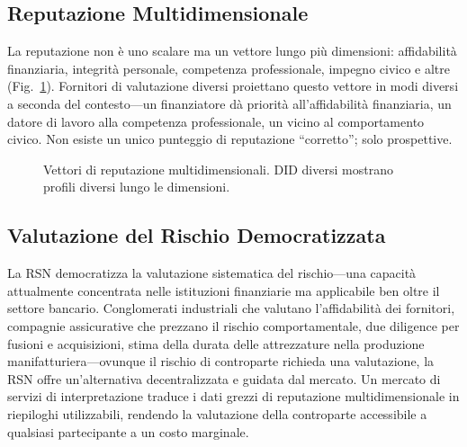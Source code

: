 \documentclass[11pt,a4paper,twocolumn]{article}
\begin{document}
\subsection{Reputazione Multidimensionale}

La reputazione non è uno scalare ma un vettore lungo più dimensioni: affidabilità finanziaria, integrità personale, competenza professionale, impegno civico e altre (Fig.~\ref{fig:reputation-radar}). Fornitori di valutazione diversi proiettano questo vettore in modi diversi a seconda del contesto---un finanziatore dà priorità all'affidabilità finanziaria, un datore di lavoro alla competenza professionale, un vicino al comportamento civico. Non esiste un unico punteggio di reputazione ``corretto''; solo prospettive.

\begin{figure}[ht]
\centering
{}
\caption{Vettori di reputazione multidimensionali. DID diversi mostrano profili diversi lungo le dimensioni.}
\label{fig:reputation-radar}
\end{figure}

\subsection{Valutazione del Rischio Democratizzata}

La RSN democratizza la valutazione sistematica del rischio---una capacità attualmente concentrata nelle istituzioni finanziarie ma applicabile ben oltre il settore bancario. Conglomerati industriali che valutano l'affidabilità dei fornitori, compagnie assicurative che prezzano il rischio comportamentale, due diligence per fusioni e acquisizioni, stima della durata delle attrezzature nella produzione manifatturiera---ovunque il rischio di controparte richieda una valutazione, la RSN offre un'alternativa decentralizzata e guidata dal mercato. Un mercato di servizi di interpretazione traduce i dati grezzi di reputazione multidimensionale in riepiloghi utilizzabili, rendendo la valutazione della controparte accessibile a qualsiasi partecipante a un costo marginale.
\end{document}
